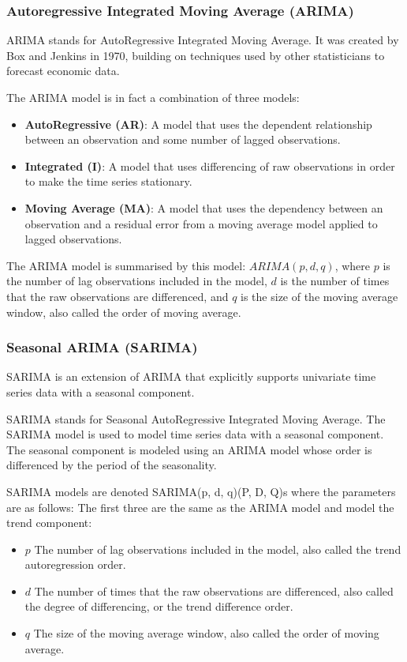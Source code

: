\documentclass[manuscript,screen,nonacm]{acmart}
\numberwithin{equation}{section}
\begin{document}
\subsubsection{Autoregressive Integrated Moving Average (ARIMA)}
ARIMA stands for AutoRegressive Integrated Moving Average. It was created by Box and Jenkins 
in 1970, building on techniques used by other statisticians to forecast economic data.

The ARIMA model is in fact a combination of three models:
\begin{itemize}
\item \textbf{AutoRegressive (AR)}: A model that uses the dependent relationship between an observation and some number of lagged observations.
\item \textbf{Integrated (I)}: A model that uses differencing of raw observations in order to make the time series stationary.
\item \textbf{Moving Average (MA)}: A model that uses the dependency between an observation and a residual error from a moving average model applied to lagged observations.
\end{itemize} 

The ARIMA model is summarised by this model: $ARIMA(p,d,q)$, where $p$ is the number of lag observations included in the model, $d$ is the number of times that the raw observations are differenced, and $q$ is the size of the moving average window, also called the order of moving average.

\subsubsection{Seasonal ARIMA (SARIMA)}
SARIMA is an extension of ARIMA that explicitly supports univariate time series data with a seasonal component.

SARIMA stands for Seasonal AutoRegressive Integrated Moving Average.
The SARIMA model is used to model time series data with a seasonal component. 
The seasonal component is modeled using an ARIMA model whose order is differenced 
by the period of the seasonality.

SARIMA models are denoted SARIMA(p, d, q)(P, D, Q)s where the parameters are as 
follows:
The first three are the same as the ARIMA model and model the trend component:
\begin{itemize}
\item $p$ The number of lag observations included in the model, also 
called the trend autoregression order.
\item $d$ The number of times that the raw observations are differenced, also 
called the degree of differencing, or the trend difference order.
\item $q$ The size of the moving average window, also called the order of moving average.
\end{itemize}
\end{document}
